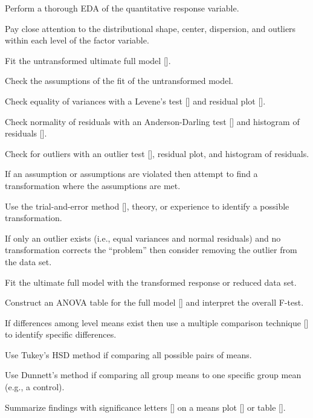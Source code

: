 \documentclass[10pt,openany]{book}\usepackage[]{graphicx}\usepackage[]{color}
\begin{document}
\begin{Enumerate}
  \item Perform a thorough EDA of the quantitative response variable.
    \begin{Itemize}
      \item Pay close attention to the distributional shape, center, dispersion, and outliers within each level of the factor variable.
    \end{Itemize}
  \item Fit the untransformed ultimate full model [].
  \item Check the assumptions of the fit of the untransformed model.
    \begin{Itemize}
      \item Check equality of variances with a Levene's test [] and residual plot [].
      \item Check normality of residuals with an Anderson-Darling test [] and histogram of residuals [].
      \item Check for outliers with an outlier test [], residual plot, and histogram of residuals.
    \end{Itemize}
  \item If an assumption or assumptions are violated then attempt to find a transformation where the assumptions are met.
    \begin{Itemize}
      \item Use the trial-and-error method [], theory, or experience to identify a possible transformation.
      \item If only an outlier exists (i.e., equal variances and normal residuals) and no transformation corrects the ``problem'' then consider removing the outlier from the data set.
      \item Fit the ultimate full model with the transformed response or reduced data set.
    \end{Itemize}
  \item Construct an ANOVA table for the full model [] and interpret the overall F-test.
  \item If differences among level means exist then use a multiple comparison technique [] to identify specific differences.
    \begin{Itemize}
      \item Use Tukey's HSD method if comparing all possible pairs of means.
      \item Use Dunnett's method if comparing all group means to one specific group mean (e.g., a control).
    \end{Itemize}
  \item Summarize findings with significance letters [] on a means plot [] or table [].
\end{Enumerate}
\end{document}
